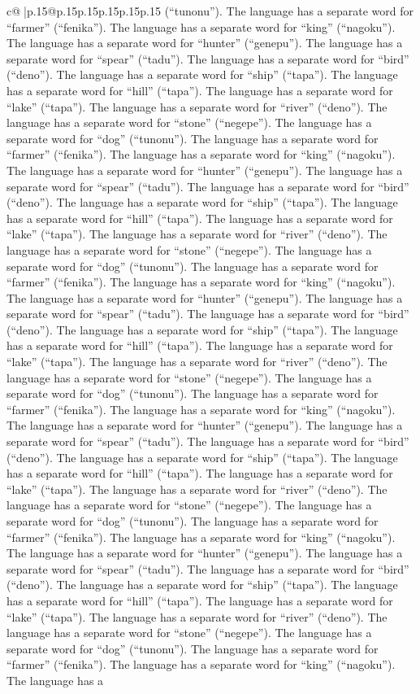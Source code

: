 \documentclass{article}
\begin{document}
{\begin{supertabular}{c@{$\;$}|p{.15\linewidth}@{}p{.15\linewidth}p{.15\linewidth}p{.15\linewidth}p{.15\linewidth}p{.15\linewidth}}
{{{(“tunonu”). The language has a separate word for “farmer” (“fenika”). The language has a separate word for “king” (“nagoku”). The language has a separate word for “hunter” (“genepu”). The language has a separate word for “spear” (“tadu”). The language has a separate word for “bird” (“deno”). The language has a separate word for “ship” (“tapa”). The language has a separate word for “hill” (“tapa”). The language has a separate word for “lake” (“tapa”). The language has a separate word for “river” (“deno”). The language has a separate word for “stone” (“negepe”). The language has a separate word for “dog” (“tunonu”). The language has a separate word for “farmer” (“fenika”). The language has a separate word for “king” (“nagoku”). The language has a separate word for “hunter” (“genepu”). The language has a separate word for “spear” (“tadu”). The language has a separate word for “bird” (“deno”). The language has a separate word for “ship” (“tapa”). The language has a separate word for “hill” (“tapa”). The language has a separate word for “lake” (“tapa”). The language has a separate word for “river” (“deno”). The language has a separate word for “stone” (“negepe”). The language has a separate word for “dog” (“tunonu”). The language has a separate word for “farmer” (“fenika”). The language has a separate word for “king” (“nagoku”). The language has a separate word for “hunter” (“genepu”). The language has a separate word for “spear” (“tadu”). The language has a separate word for “bird” (“deno”). The language has a separate word for “ship” (“tapa”). The language has a separate word for “hill” (“tapa”). The language has a separate word for “lake” (“tapa”). The language has a separate word for “river” (“deno”). The language has a separate word for “stone” (“negepe”). The language has a separate word for “dog” (“tunonu”). The language has a separate word for “farmer” (“fenika”). The language has a separate word for “king” (“nagoku”). The language has a separate word for “hunter” (“genepu”). The language has a separate word for “spear” (“tadu”). The language has a separate word for “bird” (“deno”). The language has a separate word for “ship” (“tapa”). The language has a separate word for “hill” (“tapa”). The language has a separate word for “lake” (“tapa”). The language has a separate word for “river” (“deno”). The language has a separate word for “stone” (“negepe”). The language has a separate word for “dog” (“tunonu”). The language has a separate word for “farmer” (“fenika”). The language has a separate word for “king” (“nagoku”). The language has a separate word for “hunter” (“genepu”). The language has a separate word for “spear” (“tadu”). The language has a separate word for “bird” (“deno”). The language has a separate word for “ship” (“tapa”). The language has a separate word for “hill” (“tapa”). The language has a separate word for “lake” (“tapa”). The language has a separate word for “river” (“deno”). The language has a separate word for “stone” (“negepe”). The language has a separate word for “dog” (“tunonu”). The language has a separate word for “farmer” (“fenika”). The language has a separate word for “king” (“nagoku”). The language has a }}}
\end{supertabular}}
\end{document}
